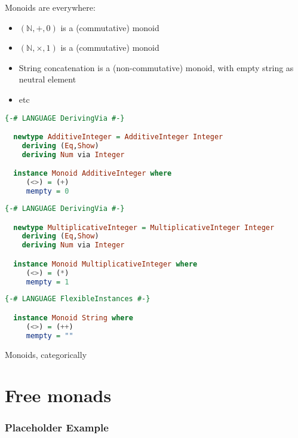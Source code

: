 \documentclass[10pt]{beamer}
\providecommand{\N}{\mathbb{N}}
\begin{document}
\begin{frame}
  Monoids are everywhere:
  \begin{itemize}
    \item $(\N, +, 0)$ is a (commutative) monoid
    \item $(\N, \times , 1)$ is a (commutative) monoid
    \item String concatenation is a (non-commutative) monoid, with empty string as neutral element
    \item etc
  \end{itemize}
\end{frame}

\begin{frame}[fragile]
  \begin{lstlisting}[language=haskell]
  {-# LANGUAGE DerivingVia #-}

  newtype AdditiveInteger = AdditiveInteger Integer
    deriving (Eq,Show)
    deriving Num via Integer

  instance Monoid AdditiveInteger where
     (<>) = (+)
     mempty = 0
  \end{lstlisting}
\end{frame}
\begin{frame}[fragile]
  \begin{lstlisting}[language=haskell]
  {-# LANGUAGE DerivingVia #-}

  newtype MultiplicativeInteger = MultiplicativeInteger Integer
    deriving (Eq,Show)
    deriving Num via Integer

  instance Monoid MultiplicativeInteger where
     (<>) = (*)
     mempty = 1
  \end{lstlisting}
\end{frame}

\begin{frame}[fragile]
  \begin{lstlisting}[language=haskell]
  {-# LANGUAGE FlexibleInstances #-}

  instance Monoid String where
     (<>) = (++)
     mempty = ""
  \end{lstlisting}
\end{frame}

\begin{frame}
  Monoids, categorically

\end{frame}


\section{Free monads}
\begin{frame}[fragile]
  \frametitle{Placeholder Example}
\end{frame}
\end{document}
